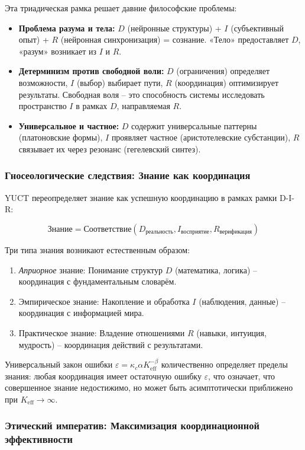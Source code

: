 \documentclass[12pt,a4paper]{article}
\newcommand{\eff}{\mathrm{eff}}
\newcommand{\Ke}{K_{\eff}}
\begin{document}
	Эта триадическая рамка решает давние философские проблемы:
	
	\begin{itemize}
		\item \textbf{Проблема разума и тела:} $D$ (нейронные структуры) + $I$ (субъективный опыт) + $R$ (нейронная синхронизация) = сознание. «Тело» предоставляет $D$, «разум» возникает из $I$ и $R$.
		\item \textbf{Детерминизм против свободной воли:} $D$ (ограничения) определяет возможности, $I$ (выбор) выбирает пути, $R$ (координация) оптимизирует результаты. Свободная воля – это способность системы исследовать пространство $I$ в рамках $D$, направляемая $R$.
		\item \textbf{Универсальное и частное:} $D$ содержит универсальные паттерны (платоновские формы), $I$ проявляет частное (аристотелевские субстанции), $R$ связывает их через резонанс (гегелевский синтез).
	\end{itemize}
	
	\subsubsection{Гносеологические следствия: Знание как координация}
	
	YUCT переопределяет знание как успешную координацию в рамках рамки D-I-R:
	
	\[
	\text{Знание} = \text{Соответствие}(D_{\text{реальность}}, I_{\text{восприятие}}, R_{\text{верификация}})
	\]
	
	Три типа знания возникают естественным образом:
	\begin{enumerate}
		\item \textit{Априорное} знание: Понимание структур $D$ (математика, логика) – координация с фундаментальным словарём.
		\item Эмпирическое знание: Накопление и обработка $I$ (наблюдения, данные) – координация с информацией мира.
		\item Практическое знание: Владение отношениями $R$ (навыки, интуиция, мудрость) – координация действий с результатами.
	\end{enumerate}
	
	Универсальный закон ошибки $\varepsilon = \kappa_c \alpha \Ke^{-\beta}$ количественно определяет пределы знания: любая координация имеет остаточную ошибку $\varepsilon$, что означает, что совершенное знание недостижимо, но может быть асимптотически приближено при $\Ke \to \infty$.
	
	\subsubsection{Этический императив: Максимизация координационной эффективности}
	
\end{document}
